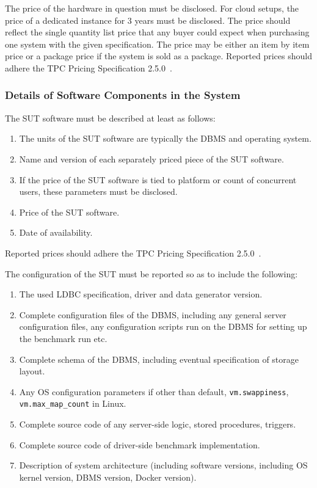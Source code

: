 The price of the hardware in question must be disclosed. For cloud setups, the price of a dedicated instance for 3 years must be disclosed. The price should reflect the single quantity list price that any buyer could expect when purchasing one system with the given specification. The price may be either an item by item price or a package price if the system is sold as a package.
Reported prices should adhere the TPC Pricing Specification 2.5.0~\cite{pricing,tpc-pricing}.

\subsubsection{Details of Software Components in the System}
The SUT software must be described at least as follows:
\begin{enumerate}
    \item The units of the SUT software are typically the DBMS and operating system.
    \item Name and version of each separately priced piece of the SUT software.
    \item If the price of the SUT software is tied to platform or count of concurrent users, these parameters must be disclosed.
    \item Price of the SUT software.
    \item Date of availability.
\end{enumerate}
Reported prices should adhere the TPC Pricing Specification 2.5.0~\cite{pricing,tpc-pricing}.

The configuration of the SUT must be reported so as to include the following:
\begin{enumerate}
    \item The used LDBC specification, driver and data generator version.
    \item Complete configuration files of the DBMS, including any general server configuration files, any configuration scripts run on the DBMS for setting up the benchmark run etc.
    \item Complete schema of the DBMS, including eventual specification of storage layout.
    \item Any OS configuration parameters if other than default, \eg \verb+vm.swappiness+, \verb+vm.max_map_count+ in Linux.
    \item Complete source code of any server-side logic, \eg stored procedures, triggers.
    \item Complete source code of driver-side benchmark implementation.
    \item Description of system architecture (including software versions, including OS kernel version, DBMS version, Docker version).
\end{enumerate}


